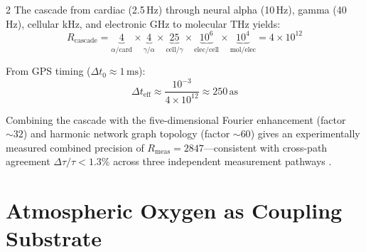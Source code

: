 \begin{multicols}{2}
The cascade from cardiac (2.5\,Hz) through neural alpha (10\,Hz), gamma (40\,Hz), cellular kHz, and electronic GHz to molecular THz yields:
\begin{equation}
R_{\mathrm{cascade}} = \underbrace{4}_{\alpha/\mathrm{card}} \times \underbrace{4}_{\gamma/\alpha} \times \underbrace{25}_{\mathrm{cell}/\gamma} \times \underbrace{10^6}_{\mathrm{elec/cell}} \times \underbrace{10^4}_{\mathrm{mol/elec}} = 4\times10^{12}
\end{equation}

From GPS timing ($\Delta t_0 \approx 1\,\mathrm{ms}$):
\begin{equation}
\Delta t_{\mathrm{eff}} \approx \frac{10^{-3}}{4\times10^{12}} \approx 250\,\mathrm{as}
\end{equation}

Combining the cascade with the five-dimensional Fourier enhancement (factor $\sim\!32$) and harmonic network graph topology (factor $\sim\!60$) gives an experimentally measured combined precision of $R_{\mathrm{meas}} = 2847$---consistent with cross-path agreement $\Delta\tau/\tau < 1.3\%$ across three independent measurement pathways \citep{sachikonye2024_variance}.

\end{multicols}

\section{Atmospheric Oxygen as Coupling Substrate}

